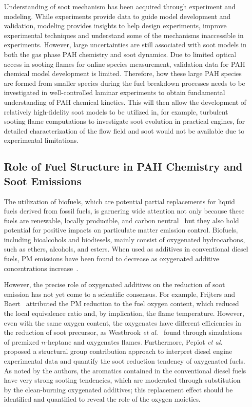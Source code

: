 Understanding of soot mechanism has been acquired through experiment and modeling.  While experiments provide data to guide model development and validation, modeling provides insights to help design experiments, improve experimental techniques and understand some of the mechanisms inaccessible in experiments.  However, large uncertainties are still associated with soot models in both the gas phase PAH chemistry and soot dynamics.  Due to limited optical access in sooting flames for online species measurement, validation data for PAH chemical model development is limited.  Therefore, how these large PAH species are formed from smaller species during the fuel breakdown processes needs to be investigated in well-controlled laminar experiments to obtain fundamental understanding of PAH chemical kinetics.  This will then allow the development of relatively high-fidelity soot models to be utilized in, for example, turbulent sooting flame computations to investigate soot evolution in practical engines, for detailed characterization of the flow field and soot would not be available due to experimental limitations.

\subsection{Role of Fuel Structure in PAH Chemistry and Soot Emissions}\label{sec:intro-biofuel}

The utilization of biofuels, which are potential partial replacements for liquid fuels derived from fossil fuels, is garnering wide attention not only because these fuels are renewable, locally producible, and carbon neutral~\cite{liu11} but they also hold potential for positive impacts on particulate matter emission control. Biofuels, including bioalcohols and biodiesels, mainly consist of oxygenated hydrocarbons, such as ethers, alcohols, and esters. When used as additives in conventional diesel fuels, PM emissions have been found to decrease as oxygenated additive concentrations increase~\cite{graboski98}.

However, the precise role of oxygenated additives on the reduction of soot emission has not yet come to a scientific consensus. For example, Frijters and Baert~\cite{frijters06} attributed the PM reduction to the fuel oxygen content, which reduced the local equivalence ratio and, by implication, the flame temperature.  However, even with the same oxygen content, the oxygenates have different efficiencies in the reduction of soot precursor, as Westbrook \emph{et al.}~\cite{westbrook06} found through simulations of premixed $n$-heptane and oxygenates flames.  Furthermore, Pepiot \emph{et al.}~\cite{pepiot08} proposed a structural group contribution approach to interpret diesel engine experimental data and quantify the soot reduction tendency of oxygenated fuels.  As noted by the authors, the aromatics contained in the conventional diesel fuels have very strong sooting tendencies, which are moderated through substitution by the clean-burning oxygenated additives; this replacement effect should be identified and quantified to reveal the role of the oxygen moieties. 

